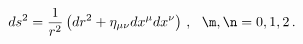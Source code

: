 \begin{equation}
ds^2=\frac{1}{r^2}\left( dr^2+\eta_{\mu\nu} dx^\mu
dx^\nu\right)\,,\,\,\,\,  \m ,\n=0,1,2\,.
\end{equation}

